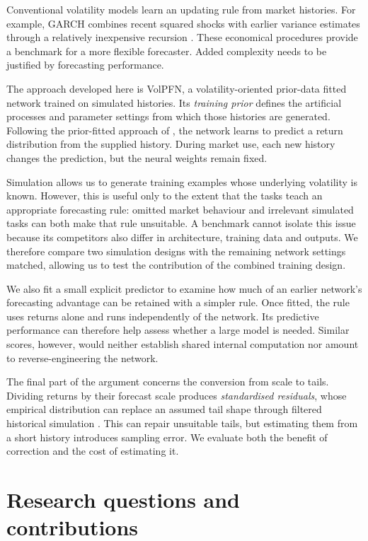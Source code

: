 Conventional volatility models learn an updating rule from market histories. For example, GARCH combines recent squared shocks with earlier variance estimates through a relatively inexpensive recursion \citep{bollerslev1986generalized}. These economical procedures provide a benchmark for a more flexible forecaster. Added complexity needs to be justified by forecasting performance.

The approach developed here is VolPFN, a volatility-oriented prior-data fitted network trained on simulated histories. Its \emph{training prior} defines the artificial processes and parameter settings from which those histories are generated. Following the prior-fitted approach of \citet{muller2022transformers}, the network learns to predict a return distribution from the supplied history. During market use, each new history changes the prediction, but the neural weights remain fixed.

Simulation allows us to generate training examples whose underlying volatility is known. However, this is useful only to the extent that the tasks teach an appropriate forecasting rule: omitted market behaviour and irrelevant simulated tasks can both make that rule unsuitable. A benchmark cannot isolate this issue because its competitors also differ in architecture, training data and outputs. We therefore compare two simulation designs with the remaining network settings matched, allowing us to test the contribution of the combined training design.

We also fit a small explicit predictor to examine how much of an earlier network's forecasting advantage can be retained with a simpler rule. Once fitted, the rule uses returns alone and runs independently of the network. Its predictive performance can therefore help assess whether a large model is needed. Similar scores, however, would neither establish shared internal computation nor amount to reverse-engineering the network.

The final part of the argument concerns the conversion from scale to tails. Dividing returns by their forecast scale produces \emph{standardised residuals}, whose empirical distribution can replace an assumed tail shape through filtered historical simulation \citep{baroneadesi1999var}. This can repair unsuitable tails, but estimating them from a short history introduces sampling error. We evaluate both the benefit of correction and the cost of estimating it.

\section{Research questions and contributions}

